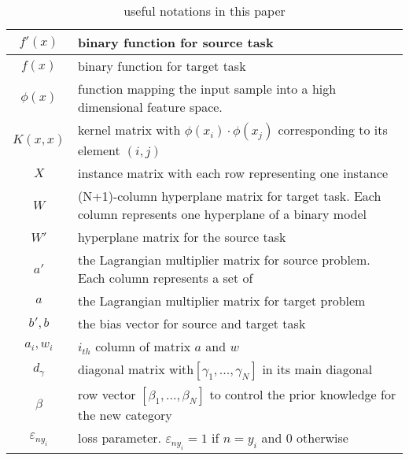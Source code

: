\begin{table}[htbp]
  \centering
  \caption{useful notations in this paper}
    \begin{tabular}{|c|L{7cm}|}
    \hline
    $f'(x)$ & binary function for source task \\
    \hline
    $f(x)$  & binary function for target task \\
    \hline
    $\phi(x)$ &  function mapping the input sample into a high dimensional feature space. \\ \hline
    $K(x,x)$ & kernel matrix with  $\phi(x_i) \cdot\phi(x_j)$ corresponding to its element $(i,j)$\\ \hline
    $X$     & instance matrix with each row representing one instance \\\hline
    $W $    & (N+1)-column hyperplane matrix for target task. Each column represents one hyperplane of a binary model \\\hline
    $W'$    & hyperplane matrix for the source task \\\hline
    $a' $   & the Lagrangian multiplier matrix for source problem. Each column represents a set of  \\\hline
    $a $    & the Lagrangian multiplier matrix for target problem \\
    \hline
    $b',b$  & the bias vector for source and target task \\
        \hline
    $a_i,w_i$ & $i_{th}$ column of matrix $a$ and $w$\\\hline
    $d_\gamma$ &  diagonal matrix with$\left[ {{\gamma _1},...,{\gamma _N}} \right]$ in its main diagonal\\\hline
    $\beta$ & row vector $\left[ {{\beta _1},...,{\beta _N}} \right]$ to control the prior knowledge for the new category\\ \hline
    $\varepsilon_{ny_i}$&loss parameter. $\varepsilon _{n{y_i}}=1$ if $n=y_i$ and 0 otherwise\\ \hline
    \end{tabular}%
  \label{tab:notation}%
\end{table}%

 

